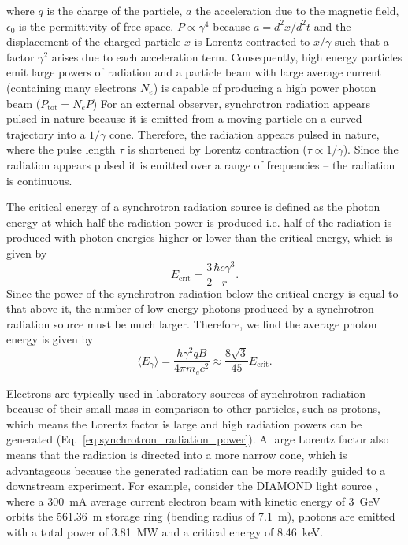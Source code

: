 \documentclass[../main.tex]{subfiles}
\begin{document}
where $q$ is the charge of the particle, $a$ the acceleration due to the magnetic field, $\epsilon_{0}$ is the permittivity of free space. $P \propto \gamma^{4}$ because $a = d^{2}x/d^{2}t$ and the displacement of the charged particle $x$ is Lorentz contracted to $x/\gamma$ such that a factor $\gamma^{2}$ arises due to each acceleration term. Consequently, high energy particles emit large powers of radiation and a particle beam with large average current (containing many electrons $N_{e}$) is capable of producing a high power photon beam ($P_{\mathrm{tot}}=N_{e}P$) For an external observer, synchrotron radiation appears pulsed in nature because it is emitted from a moving particle on a curved trajectory into a $1/\gamma$ cone. Therefore, the radiation appears pulsed in nature, where the pulse length $\tau$ is shortened by Lorentz contraction ($\tau \propto 1/\gamma$). Since the radiation appears pulsed it is emitted over a range of frequencies -- the radiation is continuous.

The critical energy of a synchrotron radiation source is defined as the photon energy at which half the radiation power is produced i.e. half of the radiation is produced with photon energies higher or lower than the critical energy, which is given by
\begin{equation}
E_{\mathrm{crit}} = \frac{3}{2}\frac{\hbar c\gamma^{3}}{r}.
\label{eq:synchrotron_critical_energy}    
\end{equation}
Since the power of the synchrotron radiation below the critical energy is equal to that above it, the number of low energy photons produced by a synchrotron radiation source must be much larger. Therefore, we find the average photon energy is given by
\begin{equation}
\langle E_{\gamma} \rangle = \frac{h\gamma^{2}qB}{4\pi m_{e}c^{2}} \approx \frac{8\sqrt{3}}{45}E_{\mathrm{crit}}.
\label{eq:synchrotron_average_energy}    
\end{equation}

Electrons are typically used in laboratory sources of synchrotron radiation because of their small mass in comparison to other particles, such as protons, which means the Lorentz factor is large and high radiation powers can be generated (Eq.~\ref{eq:synchrotron_radiation_power}). A large Lorentz factor also means that the radiation is directed into a more narrow cone, which is advantageous because the generated radiation can be more readily guided to a downstream experiment. For example, consider the DIAMOND light source \cite{materlik2015diamond}, where a 300~\si{\milli\ampere} average current electron beam with kinetic energy of 3~\si{\giga\electronvolt} orbits the 561.36~\si{\meter} storage ring (bending radius of 7.1~\si{\meter}), photons are emitted with a total power of 3.81~\si{\mega\watt} and a critical energy of 8.46~\si{\kilo\electronvolt}.   
\end{document}
